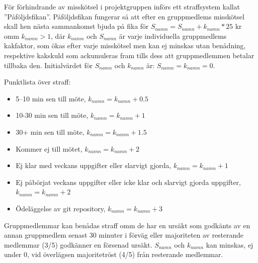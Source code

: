 \documentclass[a4paper]{article}
\begin{document}
För förhindrande av misskötsel i projektgruppen införs ett straffsystem kallat ”Påföljdsfikan”. Påföljdsfikan fungerar så att efter en gruppmedlems misskötsel skall hen nästa sammankomst bjuda på fika för $S_{namn} = S_{namn} + k_{namn}*25$ kr omm $k_{namn}>1$, där $k_{namn}$ och $S_{namn}$ är varje individuella gruppmedlems kakfaktor, som ökas efter varje misskötsel men kan ej minskas utan benådning, respektive kakskuld som ackumuleras fram tills dess att gruppmedlemmen betalar tillbaka den. Initialvärdet för $S_{namn}$ och $k_{namn}$ är: $S_{namn}=k_{namn}=0.$\\ \par
Punktlista över straff:
\begin{itemize}
	\item 5–10 min sen till möte, $k_{namn} = k_{namn} + 0.5$
	\item 10-30 min sen till möte, $k_{namn} = k_{namn} + 1$
	\item 30+ min sen till möte, $k_{namn} = k_{namn} + 1.5$
	\item Kommer ej till mötet, $k_{namn} = k_{namn} + 2$
	\item Ej klar med veckans uppgifter eller slarvigt gjorda, $k_{namn} = k_{namn} + 1$
	\item Ej påbörjat veckans uppgifter eller icke klar och slarvigt gjorda uppgifter, \indent $k_{namn} = k_{namn} + 2$
	\item Ödeläggelse av git repository, $k_{namn} = k_{namn} + 3$
\end{itemize}
\par
Gruppmedlemmar kan benådas straff omm de har en ursäkt som godkänts av en annan gruppmedlem senast 30 minuter i förväg eller majoriteten av resterande medlemmar (3/5) godkänner en försenad ursäkt. $S_{namn}$ och $k_{namn}$ kan minskas, ej under 0, vid överlägsen majoritetröst (4/5) från resterande medlemmar.



%
%
\end{document}
